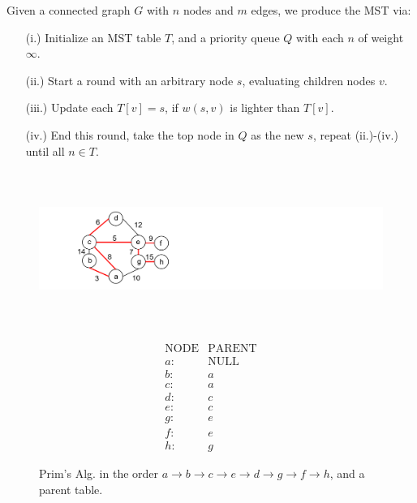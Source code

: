 \vspace{-1em}
\begin{theo}

    \label{theo:prim}
    Given a connected graph $G$ with $n$ nodes and $m$ edges, we produce the MST via:
    \begin{enumerate}
        \item [(i.)] Initialize an MST table $T$, and a priority queue $Q$ with each $n$ of weight $\infty$.
        \item [(ii.)] Start a round with an arbitrary node $s$, evaluating children nodes $v$.
        \item [(iii.)] Update each $T[v]=s$, if $w(s,v)$ is lighter than $T[v]$.
        \item [(iv.)] End this round, take the top node in $Q$ as the new $s$, repeat (ii.)-(iv.) until all $n\in T$.
    \end{enumerate}
    \noindent

\end{theo}

\vspace{-2em}
\begin{figure}[h]
    \centering
    \hfill
    \begin{minipage}{0.45\textwidth}
        \centering

        \vspace{2em}
      
        \includegraphics[height=2in]{./Sections/spanning/prims_order.png}
        
    \end{minipage}%
    \hfill
    \begin{minipage}{0.45\textwidth}
        \centering

        \vspace{2em}
        $$ \begin{matrix} 
        \text{NODE} & \text{PARENT}\\
        a: & \text{NULL}\\ 
        b: & a\\ 
        c: & a\\ 
        d: & c\\ 
        e: & c\\ 
        g: & e\\ 
        f: & e\\ 
        h: & g 
        \end{matrix} $$
    \end{minipage}
    \hfill 
    \caption{Prim's Alg. in the order $a\to b \to c \to e \to d \to g \to f \to h$, and a parent table.}
    \label{fig:prim_example}
\end{figure}

